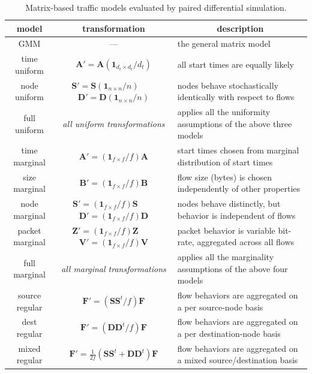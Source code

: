 \documentclass[twocolumn,final]{svjour3}
\newcommand{\ones}[1]{\mathbf{1}_{#1}}
\newcommand{\mat}[1]{\mathbf{#1}}
\begin{document}

\begin{table}
\begin{center}
\small
\begin{tabular}{|c|c|l|}
\multicolumn{1}{c}{\textbf{model}} &
\multicolumn{1}{c}{\textbf{transformation}} &
\multicolumn{1}{c}{\textbf{description}} \\
\hline
{\footnotesize{GMM}} & --- & the general matrix model \\\hline\hline
time uniform & $\mat{A}'=\mat{A}(\ones{d_t \times d_t}/d_t)$ & all start times are equally likely \\\hline
node uniform & $\mat{S}'=\mat{S}(\ones{n \times n}/n)$~~~~$\mat{D}'=\mat{D}(\ones{n \times n}/n)$ & nodes behave stochastically identically with respect to flows \\\hline
full uniform & \textit{all uniform transformations} & applies all the uniformity assumptions of the above three models \\\hline\hline
time marginal & $\mat{A}'=(\ones{f \times f}/f)\mat{A}$ & start times chosen from marginal distribution of start times \\\hline
size marginal & $\mat{B}'=(\ones{f \times f}/f)\mat{B}$ & flow size (bytes) is chosen independently of other properties \\\hline
node marginal & $\mat{S}'=(\ones{f \times f}/f)\mat{S}$~~~~$\mat{D}'=(\ones{f \times f}/f)\mat{D}$ & nodes behave distinctly, but behavior is independent of flows \\\hline
packet marginal & $\mat{Z}'=(\ones{f \times f}/f)\mat{Z}$~~~~$\mat{V}'=(\ones{f \times f}/f)\mat{V}$ & packet behavior is variable bit-rate, aggregated across all flows \\\hline
full marginal & \textit{all marginal transformations} & applies all the marginality assumptions of the above four models \\\hline\hline
source regular & $\mat{F}'=(\mat{SS}^t/f)\mat{F}$ & flow behaviors are aggregated on a per source-node basis \\\hline
dest regular & $\mat{F}'=(\mat{DD}^t/f)\mat{F}$ & flow behaviors are aggregated on a per destination-node basis \\\hline
mixed regular & $\mat{F}'=\frac{1}{2f}(\mat{SS}^t+\mat{DD}^t)\mat{F}$ & flow behaviors are aggregated on a mixed source/destination basis \\\hline
\end{tabular}
\caption{Matrix-based traffic models evaluated by paired differential simulation.}
\label{tab:traffic-models}
\end{center}
\vspace{-2em}
\end{table}
\end{document}
